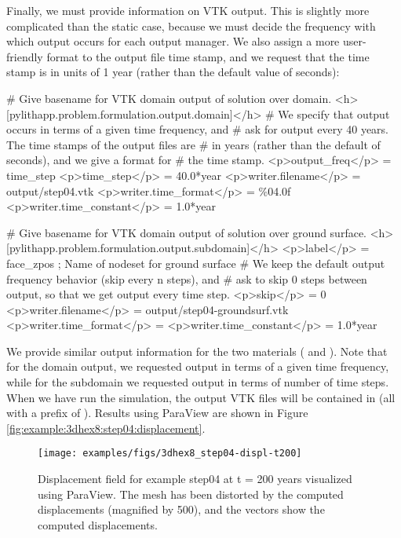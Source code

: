 Finally, we must provide information on VTK output. This is slightly
more complicated than the static case, because we must decide the
frequency with which output occurs for each output manager. We also
assign a more user-friendly format to the output file time stamp,
and we request that the time stamp is in units of 1 year (rather than
the default value of seconds):
\begin{cfg}
# Give basename for VTK domain output of solution over domain.
<h>[pylithapp.problem.formulation.output.domain]</h>
# We specify that output occurs in terms of a given time frequency, and
# ask for output every 40 years. The time stamps of the output files are
# in years (rather than the default of seconds), and we give a format for
# the time stamp.
<p>output_freq</p> = time_step
<p>time_step</p> = 40.0*year
<p>writer.filename</p> = output/step04.vtk
<p>writer.time_format</p> = \%04.0f
<p>writer.time_constant</p> = 1.0*year

# Give basename for VTK domain output of solution over ground surface.
<h>[pylithapp.problem.formulation.output.subdomain]</h>
<p>label</p> = face_zpos ; Name of nodeset for ground surface
# We keep the default output frequency behavior (skip every n steps), and
# ask to skip 0 steps between output, so that we get output every time step.
<p>skip</p> = 0
<p>writer.filename</p> = output/step04-groundsurf.vtk
<p>writer.time_format</p> = %
<p>writer.time_constant</p> = 1.0*year
\end{cfg}
We provide similar output information for the two materials (
and ). Note that for the domain output, we requested
output in terms of a given time frequency, while for the subdomain
we requested output in terms of number of time steps. When we have
run the simulation, the output VTK files will be contained in 
(all with a prefix of ). Results using ParaView are
shown in Figure \vref{fig:example:3dhex8:step04:displacement}.

\begin{figure}
  \texttt{[image: examples/figs/3dhex8\_step04-displ-t200]}
  \caption{Displacement field for example step04 at t = 200 years
    visualized using ParaView. The mesh has been distorted by the
    computed displacements (magnified by 500), and the vectors show
    the computed displacements.}
  \label{fig:example:3dhex8:step04:displacement}
\end{figure}


